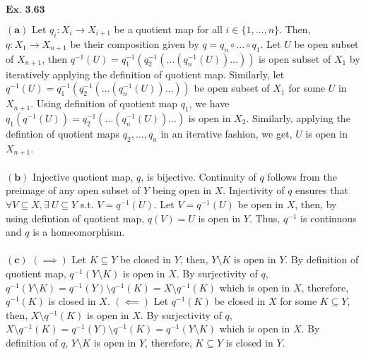\documentclass{article}
\begin{document}
\vspace{0.2in}

${\textbf{Ex. 3.63}}$

$\mathbf{(a)}$ Let $q_i:X_i \rightarrow X_{i+1}$ be a quotient map for all $i \in \{1,\ldots,n\}$. Then, $q:X_1\rightarrow X_{n+1}$ be their composition given by $q = q_n \circ \ldots \circ q_1$. Let $U$ be open subset of $X_{n+1}$, then $q^{-1}(U) = q_{1}^{-1}(q_{2}^{-1}(\ldots(q_{n}^{-1}(U))\ldots))$ is open subset of $X_1$ by iteratively applying the definition of quotient map. Similarly, let $q^{-1}(U) = q_{1}^{-1}(q_{2}^{-1}(\ldots(q_{n}^{-1}(U))\ldots))$ be open subset of $X_1$ for some $U$ in $X_{n+1}$. Using definition of quotient map $q_1$, we have $q_1(q^{-1}(U)) = q_{2}^{-1}(\ldots(q_{n}^{-1}(U))\ldots)$ is open in $X_2$. Similarly, applying the defintion of quotient maps $q_2, \ldots, q_{n}$ in an iterative fashion, we get, $U$ is open in $X_{n+1}$.\\~\\

$\mathbf{(b)}$ Injective quotient map, $q$, is bijective. Continuity of $q$ follows from the preimage of any open subset of $Y$ being open in $X$. Injectivity of $q$ ensures that $\forall V \subseteq X, \exists\ U \subseteq Y$ s.t. $V = q^{-1}(U)$. Let $V=q^{-1}(U)$ be open in $X$, then, by using defintion of quotient map, $q(V) = U$ is open in $Y$. Thus, $q^{-1}$ is continuous and $q$ is a homeomorphism.\\~\\

$\mathbf{(c)}$ $(\implies)$ Let $K\subseteq Y$ be closed in $Y$, then, $Y \setminus K$ is open in $Y$. By definition of quotient map, $q^{-1}(Y\setminus K)$ is open in $X$. By surjectivity of $q$, $q^{-1}(Y\setminus K) = q^{-1}(Y)\setminus q^{-1}(K) = X \setminus q^{-1}(K)$ which is open in $X$, therefore, $q^{-1}(K)$ is closed in $X$. $(\impliedby)$ Let $q^{-1}(K)$ be closed in $X$ for some $K\subseteq Y$, then, $X \setminus q^{-1}(K)$ is open in $X$. By surjectivity of $q$, $X \setminus q^{-1}(K) = q^{-1}(Y) \setminus q^{-1}(K) = q^{-1}(Y\setminus K)$ which is open in $X$. By definition of $q$, $Y\setminus K$ is open in $Y$, therefore, $K \subseteq Y$ is closed in $Y$.\\~\\
\end{document}
